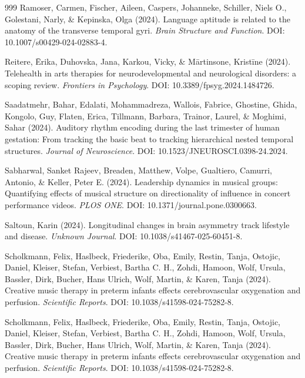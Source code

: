 \documentclass[9pt,onecolumn]{article}
\begin{document}
\begin{thebibliography}{999}
Ramoser, Carmen, Fischer, Aileen, Caspers, Johanneke, Schiller, Niels O., Golestani, Narly, \& Kepinska, Olga (2024). Language aptitude is related to the anatomy of the transverse temporal gyri. \textit{Brain Structure and Function}. DOI: 10.1007/s00429-024-02883-4.

Reitere, Ērika, Duhovska, Jana, Karkou, Vicky, \& Mārtinsone, Kristīne (2024). Telehealth in arts therapies for neurodevelopmental and neurological disorders: a scoping review. \textit{Frontiers in Psychology}. DOI: 10.3389/fpsyg.2024.1484726.

Saadatmehr, Bahar, Edalati, Mohammadreza, Wallois, Fabrice, Ghostine, Ghida, Kongolo, Guy, Flaten, Erica, Tillmann, Barbara, Trainor, Laurel, \& Moghimi, Sahar (2024). Auditory rhythm encoding during the last trimester of human gestation: From tracking the basic beat to tracking hierarchical nested temporal structures. \textit{Journal of Neuroscience}. DOI: 10.1523/JNEUROSCI.0398-24.2024.

Sabharwal, Sanket Rajeev, Breaden, Matthew, Volpe, Gualtiero, Camurri, Antonio, \& Keller, Peter E. (2024). Leadership dynamics in musical groups: Quantifying effects of musical structure on directionality of influence in concert performance videos. \textit{PLOS ONE}. DOI: 10.1371/journal.pone.0300663.

Saltoun, Karin (2024). Longitudinal changes in brain asymmetry track lifestyle and disease. \textit{Unknown Journal}. DOI: 10.1038/s41467-025-60451-8.

Scholkmann, Felix, Haslbeck, Friederike, Oba, Emily, Restin, Tanja, Ostojic, Daniel, Kleiser, Stefan, Verbiest, Bartha C. H., Zohdi, Hamoon, Wolf, Ursula, Bassler, Dirk, Bucher, Hans Ulrich, Wolf, Martin, \& Karen, Tanja (2024). Creative music therapy in preterm infants effects cerebrovascular oxygenation and perfusion. \textit{Scientific Reports}. DOI: 10.1038/s41598-024-75282-8.

Scholkmann, Felix, Haslbeck, Friederike, Oba, Emily, Restin, Tanja, Ostojic, Daniel, Kleiser, Stefan, Verbiest, Bartha C. H., Zohdi, Hamoon, Wolf, Ursula, Bassler, Dirk, Bucher, Hans Ulrich, Wolf, Martin, \& Karen, Tanja (2024). Creative music therapy in preterm infants effects cerebrovascular oxygenation and perfusion. \textit{Scientific Reports}. DOI: 10.1038/s41598-024-75282-8.


\end{thebibliography}
\end{document}
